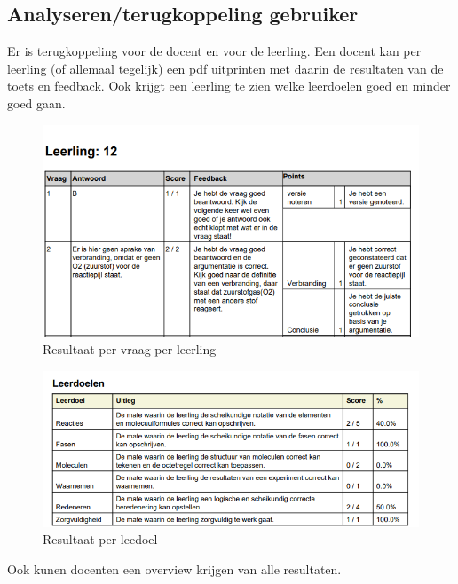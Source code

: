 \documentclass[12pt]{article}
\begin{document}
\subsection{Analyseren/terugkoppeling gebruiker}
Er is terugkoppeling voor de docent en voor de leerling. Een docent kan per leerling (of allemaal tegelijk) een pdf uitprinten met daarin de resultaten van de toets en feedback. Ook krijgt een leerling te zien welke leerdoelen goed en minder goed gaan.
\begin{figure}[H]
    \centering
    \includegraphics[width=\linewidth]{./images/demo/analisys/question.png}
    \caption{Resultaat per vraag per leerling}
    \label{fig:result-per-question}
\end{figure}
\begin{figure}[H]
    \centering
    \includegraphics[width=\linewidth]{./images/demo/analisys/target.png}
    \caption{Resultaat per leedoel}
    \label{fig:result-per-target}
\end{figure}
\pagebreak
Ook kunen docenten een overview krijgen van alle resultaten.
\end{document}
